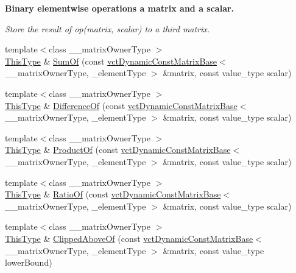 \begin{Indent}{\bf Binary elementwise operations a matrix and a scalar.}\par
{\em Store the result of op(matrix, scalar) to a third matrix. }\begin{DoxyCompactItemize}
\item 
{\footnotesize template$<$class \+\_\+\+\_\+matrix\+Owner\+Type $>$ }\\\hyperlink{classvct_dynamic_const_matrix_base_ac4ff48cbe4d9de3fdef5a02447ffb9db}{This\+Type} \& \hyperlink{classvct_dynamic_matrix_base_a325e7079c6b0606ef803b1a0d6fd009f}{Sum\+Of} (const \hyperlink{classvct_dynamic_const_matrix_base}{vct\+Dynamic\+Const\+Matrix\+Base}$<$ \+\_\+\+\_\+matrix\+Owner\+Type, \+\_\+element\+Type $>$ \&matrix, const value\+\_\+type scalar)
\item 
{\footnotesize template$<$class \+\_\+\+\_\+matrix\+Owner\+Type $>$ }\\\hyperlink{classvct_dynamic_const_matrix_base_ac4ff48cbe4d9de3fdef5a02447ffb9db}{This\+Type} \& \hyperlink{classvct_dynamic_matrix_base_a57823b1ecc143bcbcf9c3b9982c7cf67}{Difference\+Of} (const \hyperlink{classvct_dynamic_const_matrix_base}{vct\+Dynamic\+Const\+Matrix\+Base}$<$ \+\_\+\+\_\+matrix\+Owner\+Type, \+\_\+element\+Type $>$ \&matrix, const value\+\_\+type scalar)
\item 
{\footnotesize template$<$class \+\_\+\+\_\+matrix\+Owner\+Type $>$ }\\\hyperlink{classvct_dynamic_const_matrix_base_ac4ff48cbe4d9de3fdef5a02447ffb9db}{This\+Type} \& \hyperlink{classvct_dynamic_matrix_base_a05f7d5634a169de67aec9bff5dd3a7ce}{Product\+Of} (const \hyperlink{classvct_dynamic_const_matrix_base}{vct\+Dynamic\+Const\+Matrix\+Base}$<$ \+\_\+\+\_\+matrix\+Owner\+Type, \+\_\+element\+Type $>$ \&matrix, const value\+\_\+type scalar)
\item 
{\footnotesize template$<$class \+\_\+\+\_\+matrix\+Owner\+Type $>$ }\\\hyperlink{classvct_dynamic_const_matrix_base_ac4ff48cbe4d9de3fdef5a02447ffb9db}{This\+Type} \& \hyperlink{classvct_dynamic_matrix_base_a6f7fb3c88d0e1f1a78a78474664e8477}{Ratio\+Of} (const \hyperlink{classvct_dynamic_const_matrix_base}{vct\+Dynamic\+Const\+Matrix\+Base}$<$ \+\_\+\+\_\+matrix\+Owner\+Type, \+\_\+element\+Type $>$ \&matrix, const value\+\_\+type scalar)
\item 
{\footnotesize template$<$class \+\_\+\+\_\+matrix\+Owner\+Type $>$ }\\\hyperlink{classvct_dynamic_const_matrix_base_ac4ff48cbe4d9de3fdef5a02447ffb9db}{This\+Type} \& \hyperlink{classvct_dynamic_matrix_base_aac478e047096c7e76955de0c4107c764}{Clipped\+Above\+Of} (const \hyperlink{classvct_dynamic_const_matrix_base}{vct\+Dynamic\+Const\+Matrix\+Base}$<$ \+\_\+\+\_\+matrix\+Owner\+Type, \+\_\+element\+Type $>$ \&matrix, const value\+\_\+type lower\+Bound)

\end{DoxyCompactItemize}
\end{Indent}
